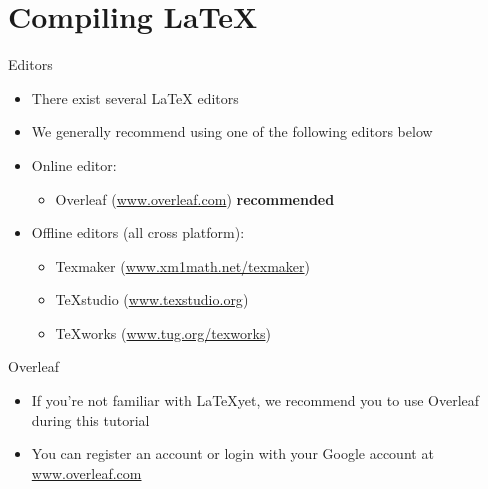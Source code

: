 \documentclass{beamer}
\begin{document}
\section{Compiling LaTeX}
\begin{frame}{Editors}
    \begin{itemize}
        \item There exist several \LaTeX{} editors
        \item We generally recommend using one of the following editors below
        \item Online editor:
            \begin{itemize}
                \item Overleaf (\url{www.overleaf.com}) \hspace{2pt} \textbf{recommended}
            \end{itemize}
        \item Offline editors (all cross platform):
        \begin{itemize}
            \item Texmaker (\url{www.xm1math.net/texmaker})
            \item TeXstudio (\url{www.texstudio.org})
            \item TeXworks (\url{www.tug.org/texworks})
        \end{itemize}
    \end{itemize}
\end{frame}

\begin{frame}{Overleaf}
    \begin{itemize}
        \item If you're not familiar with \LaTeX yet, we recommend you to use Overleaf during this tutorial
        \item You can register an account or login with your Google account at \url{www.overleaf.com}
    \end{itemize}
\end{frame}
\end{document}
